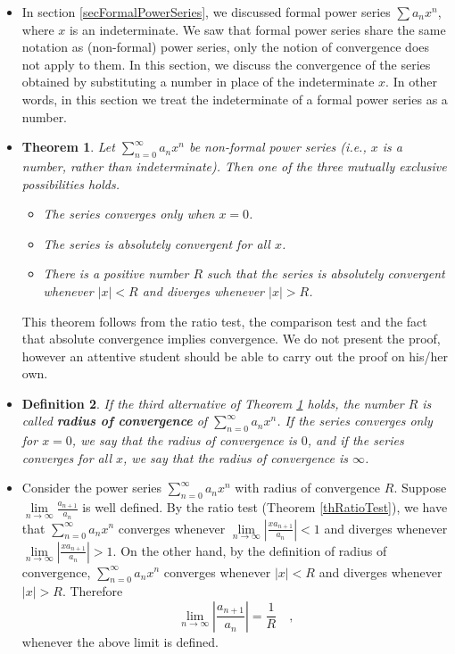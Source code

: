 \documentclass[12pt]{book}
\newtheorem{theorem}{Theorem}[section]
\newtheorem{definition}[theorem]{Definition}
\renewcommand{\emph}{\textbf}
\begin{document}
\begin{itemize}
\item In section \ref{secFormalPowerSeries}, we discussed formal power series $\sum a_n x^n$, where $x$ is an indeterminate. We saw that formal power series share the same notation as (non-formal) power series, only the notion of convergence does not apply to them. In this section, we discuss the convergence of the series obtained by substituting a number in place of the indeterminate $x$. In other words, in this section we treat the indeterminate of a formal power series as a number.
\item 
\begin{theorem}\label{thRadiusConvergence} Let $\sum\limits_{n=0}^\infty a_n x^n$ be non-formal power series (i.e., $x$ is a number, rather than indeterminate). Then one of the three mutually exclusive possibilities holds.
\begin{itemize}
\item The series converges only when $x=0$.
\item The series is absolutely convergent for all $x$.
\item There is a positive number $R$ such that the series is absolutely convergent whenever $|x|<R$ and diverges whenever $|x|>R$.
\end{itemize}
\end{theorem}
This theorem follows from the ratio test, the comparison test and the fact that absolute convergence implies convergence. We do not present the proof, however an attentive student should be able to carry out the proof on his/her own.
\item 
\begin{definition}\label{defRadiusConvergence} 
If the third alternative of Theorem \ref{thRadiusConvergence} holds, the number $R$ is called \emph{radius of convergence} of $\sum\limits_{n=0}^\infty a_n x^n$. If the series converges only for $x=0$, we say that the radius of convergence is $0$, and if the series converges for all $x$, we say that the radius of convergence is $\infty$.
\end{definition}

\item Consider the power series $\sum\limits_{n=0}^\infty a_n x^n$ with radius of convergence $R$.  Suppose $\lim\limits_{n\to\infty} \frac{a_{n+1}}{a_n}$ is well defined. By the ratio test (Theorem \ref{thRatioTest}), we have that  $\sum\limits_{n=0}^\infty a_n x^n$ converges whenever $\lim\limits_{n\to\infty} \left|\frac{xa_{n+1}}{a_n}\right|<1$ and diverges whenever $\lim\limits_{n\to\infty} \left|\frac{xa_{n+1}}{a_n}\right|>1$. On the other hand, by the definition of radius of convergence, $\sum\limits_{n=0}^\infty a_n x^n$ converges whenever $|x|<R$ and diverges whenever $|x|>R$. Therefore 
\[
\lim\limits_{n\to\infty} \left|\frac{a_{n+1}}{a_n}\right|=\frac{1}{R}\quad,
\]
whenever the above limit is defined.
 

\end{itemize}
\end{document}
